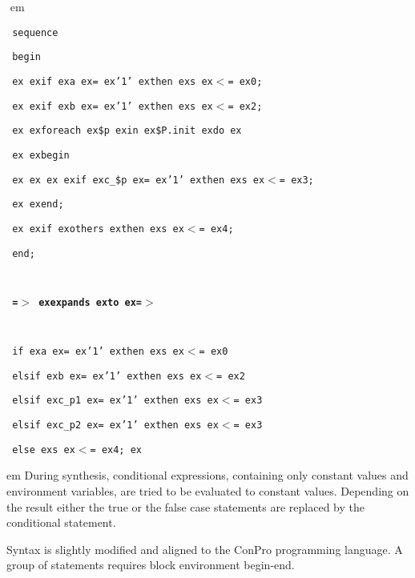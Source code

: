 \documentclass[a4paper,12pt,twoside,english]{article}
\def\s{\hskip 1.15 ex}
\begin{document}
\begin{description}
\begin{description}
\def\prefskipu{}\def\prefskipo{}\def\prefskipa{}\def\prefskipu{\hskip10pt}\def\prefskipo{\hskip10pt}\def\prefskipa{\hskip30pt}\def\content{
\vskip-5pt{\parindent0pt\parbox{\linewidth}{\tt\smallsize\hskip10pt sequence}}
\vskip-5pt{\parindent0pt\parbox{\linewidth}{\tt\smallsize\hskip10pt begin}}
\vskip-5pt{\parindent0pt\parbox{\linewidth}{\tt\smallsize\hskip10pt \s \s if\s a\s =\s '1'\s then\s s\s $<$=\s 0;}}
\vskip-5pt{\parindent0pt\parbox{\linewidth}{\tt\smallsize\hskip10pt \s \s if\s b\s =\s '1'\s then\s s\s $<$=\s 2;}}
\vskip-5pt{\parindent0pt\parbox{\linewidth}{\tt\smallsize\hskip10pt \s \s foreach\s \$p\s in\s \$P.init\s do\s }}
\vskip-5pt{\parindent0pt\parbox{\linewidth}{\tt\smallsize\hskip10pt \s \s begin}}
\vskip-5pt{\parindent0pt\parbox{\linewidth}{\tt\smallsize\hskip10pt \s \s \s \s if\s c\_\$p\s =\s '1'\s then\s s\s $<$=\s 3;}}
\vskip-5pt{\parindent0pt\parbox{\linewidth}{\tt\smallsize\hskip10pt \s \s end;}}
\vskip-5pt{\parindent0pt\parbox{\linewidth}{\tt\smallsize\hskip10pt \s \s if\s others\s then\s s\s $<$=\s 4;}}
\vskip-5pt{\parindent0pt\parbox{\linewidth}{\tt\smallsize\hskip10pt end;}}
\vskip-5pt{\parindent0pt\parbox{\linewidth}{\tt\smallsize\hskip10pt }}
\vskip-5pt{\parindent0pt\parbox{\linewidth}{\tt\smallsize\hskip10pt {\bfseries =$>$\s expands\s to\s =$>$}}}
\vskip-5pt{\parindent0pt\parbox{\linewidth}{\tt\smallsize\hskip10pt }}
\vskip-5pt{\parindent0pt\parbox{\linewidth}{\tt\smallsize\hskip10pt if\s a\s =\s '1'\s then\s s\s $<$=\s 0}}
\vskip-5pt{\parindent0pt\parbox{\linewidth}{\tt\smallsize\hskip10pt elsif\s b\s =\s '1'\s then\s s\s $<$=\s 2}}
\vskip-5pt{\parindent0pt\parbox{\linewidth}{\tt\smallsize\hskip10pt elsif\s c\_p1\s =\s '1'\s then\s s\s $<$=\s 3}}
\vskip-5pt{\parindent0pt\parbox{\linewidth}{\tt\smallsize\hskip10pt elsif\s c\_p2\s =\s '1'\s then\s s\s $<$=\s 3}}
\vskip-5pt{\parindent0pt\parbox{\linewidth}{\tt\smallsize\hskip10pt else\s s\s $<$=\s 4;\s }}
}
$ $
 em
\content
{} em
During synthesis, conditional expressions, containing only constant values and environment variables, are tried to be evaluated to constant values. Depending on
the result either the true or the false case statements are replaced by the conditional statement. 


\item[\colorit{\bf case}] $ $\\
Syntax is slightly modified and aligned to the ConPro programming language. A group of statements requires block environment begin-end.


\end{description}
\end{description}
\end{document}

